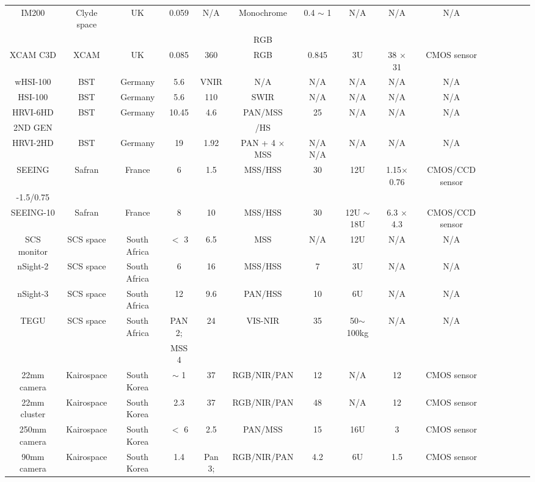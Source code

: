 \documentclass[final,5p,times,twocolumn]{elsarticle}
\begin{document}
\begin{table}
{\begin{tabular}{c c c c c c c c c c c c c c c}
			IM200 & Clyde space & UK & 0.059 & N/A & Monochrome & 0.4 $\sim$ 1 & N/A & N/A & N/A & \citep{clyde2023}\\
			& & & & &  RGB & & & & & & &  \\
			XCAM C3D & XCAM & UK & 0.085 & 360 & RGB & 0.845 & 3U & 38 $\times$ 31 & CMOS sensor & \citep{casini2020towards, xcam2023}\\
			wHSI-100 & BST & Germany & 5.6 &  VNIR & N/A &N/A & N/A & N/A &  N/A &\citep{bst2023}\\
			HSI-100 & BST & Germany & 5.6 & 110 &SWIR & N/A & N/A & N/A & N/A & \citep{bst2023}\\
			HRVI-6HD & BST & Germany & 10.45 & 4.6 &  PAN/MSS & 25 &  N/A & N/A & N/A & \citep{bst2023}\\
			2ND GEN& & & & &  /HS & & & & & & &  \\
			HRVI-2HD & BST & Germany & 19 & 1.92 &  PAN + 4 $\times$ MSS & N/A  N/A & N/A & N/A & N/A &\citep{bst2023}\\
			SEEING & Safran & France & 6 & 1.5 &  MSS/HSS & 30 & 12U & 1.15$\times$0.76 & CMOS/CCD  sensor & \citep{safran2023}\\
			-1.5/0.75 & & & & & & & & & & & & &  \\
			SEEING-10 & Safran & France & 8 & 10 & MSS/HSS & 30 &  12U $\sim$ 18U & 6.3 $\times$ 4.3 & CMOS/CCD sensor & \citep{safran2023}\\
			SCS monitor & SCS space & South Africa & $<$ 3 & 6.5 & MSS & N/A &  12U & N/A & N/A & \citep{scs2023}\\
			nSight-2 & SCS space & South Africa & 6 & 16 &  MSS/HSS & 7 & 3U & N/A & N/A & \cite{scs2023}\\
			nSight-3 & SCS space & South Africa & 12 & 9.6 &  PAN/HSS & 10 &  6U & N/A & N/A & \citep{scs2023}\\
			TEGU & SCS space & South Africa &  PAN 2; & 24 & VIS-NIR & 35 &  50$\sim$100kg & N/A & N/A & \citep{scs2023}\\
			& & & MSS 4 & &  & & & & & & &  \\
			22mm camera & Kairospace & South Korea & $\sim$ 1 & 37 & RGB/NIR/PAN & 12 &  N/A & 12 & CMOS sensor  & \citep{kairo2023} \\
			22mm cluster & Kairospace & South Korea & 2.3 & 37 &  RGB/NIR/PAN & 48 &  N/A & 12 & CMOS sensor  & \citep{kairo2023} \\
			250mm camera & Kairospace & South Korea & $<$ 6 & 2.5 & PAN/MSS & 15 &  16U & 3 & CMOS  sensor & \citep{kairo2023} \\
			90mm camera & Kairospace & South Korea & 1.4 & Pan 3; & RGB/NIR/PAN & 4.2 &  6U & 1.5 & CMOS sensor & \citep{kairo2023} \\

\end{tabular}}
\end{table}
\end{document}
